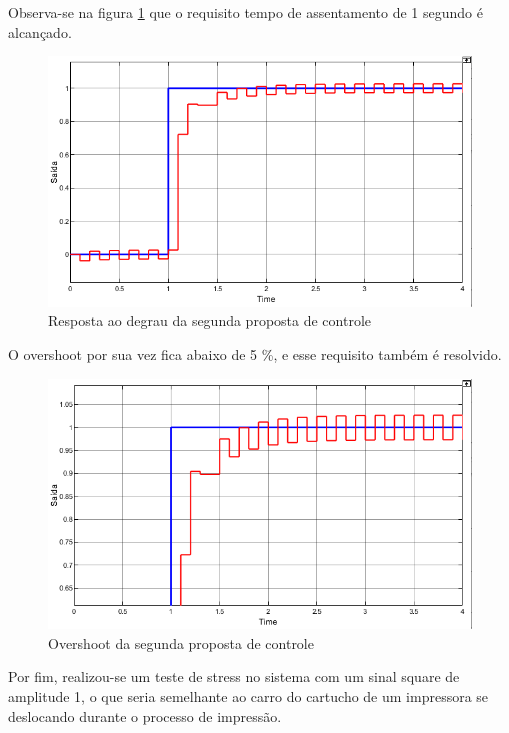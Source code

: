 \documentclass[a4paper,11pt]{article}
\begin{document}
Observa-se na figura \ref{fig:degrauavanco} que o requisito tempo de assentamento de 1 segundo é alcançado.

\begin{figure}[H]
    \centering
    \includegraphics[width=\linewidth]{src/tex/img/saida_controle_2.png}
    \caption{Resposta ao degrau da segunda proposta de controle}
    \label{fig:degrauavanco}
\end{figure}

O overshoot por sua vez fica abaixo de 5 \%, e esse requisito também é resolvido.

\begin{figure}[H]
    \centering
    \includegraphics[width=\linewidth]{src/tex/img/saida_controle_2_up.PNG}
    \caption{Overshoot da segunda proposta de controle}
    \label{fig:lgr}
\end{figure}

Por fim, realizou-se um teste de stress no sistema com um sinal square de amplitude 1, o que seria semelhante ao carro do cartucho de um impressora se deslocando durante o processo de impressão.
\end{document}
